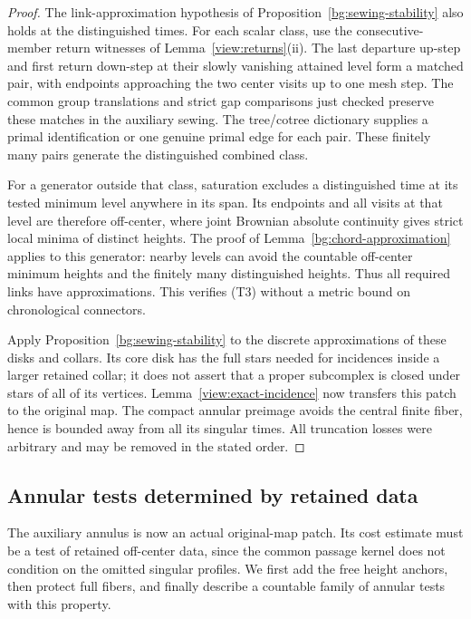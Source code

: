 \begin{proof}
The link-approximation hypothesis of Proposition~\ref{bg:sewing-stability}
also holds at the distinguished times.  For each scalar class, use
the consecutive-member return witnesses of Lemma~\ref{view:returns}(ii).
The last departure up-step and first return down-step at their slowly
vanishing attained level form a matched pair, with endpoints approaching
the two center visits up to one mesh step.  The common group translations
and strict gap comparisons just checked preserve these matches in the
auxiliary sewing.  The tree/cotree dictionary supplies a primal
identification or one genuine primal edge for each pair.  These
finitely many pairs generate the distinguished combined class.

For a generator outside that class, saturation excludes a distinguished
time at its tested minimum level anywhere in its span.  Its endpoints
and all visits at that level are therefore off-center, where joint
Brownian absolute continuity gives strict local minima of distinct
heights.  The proof of Lemma~\ref{bg:chord-approximation} applies to
this generator: nearby levels can avoid the countable off-center
minimum heights and the finitely many distinguished heights.  Thus
all required links have approximations.  This verifies (T3) without
a metric bound on chronological connectors.

Apply Proposition~\ref{bg:sewing-stability} to the discrete approximations
of these disks and collars.  Its core disk has the full stars needed
for incidences inside a larger retained collar; it does not assert that
a proper subcomplex is closed under stars of all of its vertices.
Lemma~\ref{view:exact-incidence} now transfers this patch to the original
map.  The compact annular preimage avoids the central finite fiber, hence
is bounded away from all its singular times.  All truncation losses were
arbitrary and may be removed in the stated order.
\end{proof}

\subsection{Annular tests determined by retained data}

The auxiliary annulus is now an actual original-map patch.  Its cost
estimate must be a test of retained off-center data, since the common
passage kernel does not condition on the omitted singular profiles.
We first add the free height anchors, then protect full fibers, and
finally describe a countable family of annular tests with this property.

